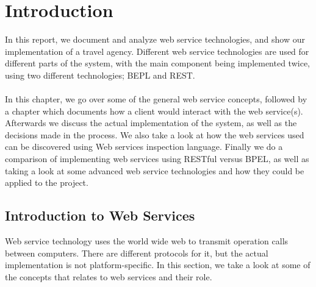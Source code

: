 \chapter{Introduction}
In this report, we document and analyze web service technologies, and show our implementation of a travel agency. Different web service technologies are used for different parts of the system, with the main component being implemented twice, using two different technologies; BEPL and REST.\\\\
In this chapter, we go over some of the general web service concepts, followed by a chapter which documents how a client would interact with the web service(s). Afterwards we discuss the actual implementation of the system, as well as the decisions made in the process. We also take a look at how the web services used can be discovered using Web services inspection language. Finally we do a comparison of implementing web services using RESTful versus BPEL, as well as taking a look at some advanced web service technologies and how they could be applied to the project.


\section{Introduction to Web Services}

Web service technology uses the world wide web to transmit operation calls between computers. There are different protocols for it, but the actual implementation is not platform-specific. In this section, we take a look at some of the concepts that relates to web services and their role. 


